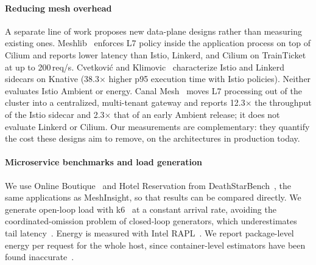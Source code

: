 \paragraph{Reducing mesh overhead}
A separate line of work proposes new data-plane designs rather than measuring
existing ones. Meshlib~\cite{mostafaei2026meshlib} enforces L7 policy inside the application
process on top of Cilium and reports lower latency than Istio, Linkerd, and
Cilium on TrainTicket at up to 200\,req/s. Cvetkovi\'c and
Klimovic~\cite{cvetkovic2025lightweight} characterize Istio and Linkerd
sidecars on Knative (38.3$\times$ higher p95 execution time with Istio
policies). Neither evaluates Istio Ambient or energy. Canal Mesh~\cite{song2024canal}
moves L7 processing out of the cluster into a centralized, multi-tenant
gateway and reports 12.3$\times$ the throughput of the Istio sidecar and
2.3$\times$ that of an early Ambient release; it does not evaluate Linkerd or
Cilium. Our measurements are complementary: they quantify the cost these
designs aim to remove, on the architectures in production today.

\paragraph{Microservice benchmarks and load generation}
We use Online Boutique~\cite{onlineboutique} and Hotel Reservation from
DeathStarBench~\cite{gan2019deathstarbench}, the same applications as
MeshInsight, so that results can be compared directly. We generate open-loop
load with k6~\cite{k6} at a constant arrival rate, avoiding the
coordinated-omission problem of closed-loop generators, which underestimates
tail latency~\cite{tene2015latency}. Energy is measured with Intel
RAPL~\cite{khan2018rapl}.
We report package-level energy per request for the whole host, since
container-level estimators have been found inaccurate~\cite{pijnacker2025kepler,thamm2025rapl}.
